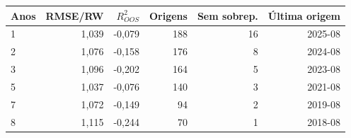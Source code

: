 \begin{tabular}{lrrrrr}
\toprule
Anos & RMSE/RW & $R^2_{OOS}$ & Origens & Sem sobrep. & Última origem \\
\midrule
1 & 1,039 & -0,079 & 188 & 16 & 2025-08 \\
2 & 1,076 & -0,158 & 176 & 8 & 2024-08 \\
3 & 1,096 & -0,202 & 164 & 5 & 2023-08 \\
5 & 1,037 & -0,076 & 140 & 3 & 2021-08 \\
7 & 1,072 & -0,149 & 94 & 2 & 2019-08 \\
8 & 1,115 & -0,244 & 70 & 1 & 2018-08 \\
\bottomrule
\end{tabular}